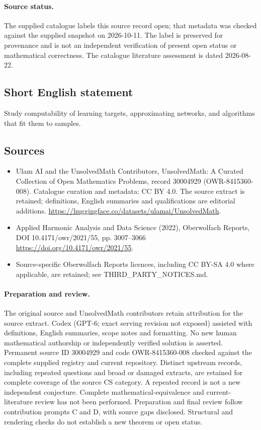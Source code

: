 \documentclass[11pt]{article}
\begin{document}
\paragraph{Source status.}
The supplied catalogue labels this source record open; that metadata was checked against the supplied snapshot on 2026-10-11. The label is preserved for provenance and is not an independent verification of present open status or mathematical correctness. The catalogue literature assessment is dated 2026-08-22.
\subsection{Short English statement}
Study computability of learning targets, approximating networks, and algorithms that fit them to samples.
\subsection{Sources}
\begin{itemize}
\item[\hypertarget{source:30004929:1}{S1}] Ulam AI and the UnsolvedMath Contributors, UnsolvedMath: A Curated Collection of Open Mathematics Problems, record 30004929 (OWR-8415360-008). Catalogue curation and metadata: CC BY 4.0. The source extract is retained; definitions, English summaries and qualifications are editorial additions.
\url{https://huggingface.co/datasets/ulamai/UnsolvedMath}.
\item[\hypertarget{source:30004929:2}{S2}] Applied Harmonic Analysis and Data Science (2022), Oberwolfach Reports, DOI 10.4171/owr/2021/55, pp. 3007--3066
\url{https://doi.org/10.4171/owr/2021/55}.
\item Source-specific Oberwolfach Reports licences, including CC BY-SA 4.0 where applicable, are retained; see THIRD\_PARTY\_NOTICES.md.
\end{itemize}
\paragraph{Preparation and review.}
The original source and UnsolvedMath contributors retain attribution for the source extract. Codex (GPT-6; exact serving revision not exposed) assisted with definitions, English summaries, scope notes and formatting. No new human mathematical authorship or independently verified solution is asserted. Permanent source ID 30004929 and code OWR-8415360-008 checked against the complete supplied registry and current repository. Distinct upstream records, including repeated questions and broad or damaged extracts, are retained for complete coverage of the source CS category. A repeated record is not a new independent conjecture. Complete mathematical-equivalence and current-literature review has not been performed. Preparation and final review follow contribution prompts C and D, with source gaps disclosed. Structural and rendering checks do not establish a new theorem or open status.
\label{end:30004929}
\end{document}
